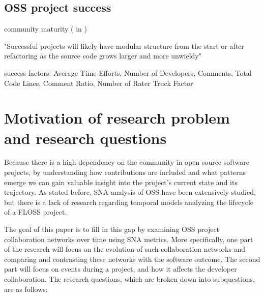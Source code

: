 \subsection{OSS project success}
community maturity (\cite{linBlogCommunityDiscovery2007} in \cite{aljemabiEmpiricalStudyEvolution2018})

"Successful projects will likely have modular structure from the start or after refactoring as the source code grows larger and more unwieldy" \cite{antwerpEvolutionOpenSource2010}

success factors: Average Time Efforts, Number of Developers, Comments, Total Code Lines, Comment Ratio, Number of Rater \cite{yangHowMicrobloggingNetworks2013}
Truck Factor \cite{avelinoNovelApproachEstimating2016}


\section{Motivation of research problem and research questions}
Because there is a high dependency on the community in open source software projects, by understanding how contributions are included and what patterns emerge we can gain valuable insight into the project's current state and its trajectory. As stated before, SNA analysis of OSS have been extensively studied, but there is a lack of research regarding temporal models analyzing the lifecycle of a FLOSS project.

The goal of this paper is to fill in this gap by examining OSS project collaboration networks over time using SNA metrics. More specifically, one part of the research will focus on the evolution of such collaboration networks and comparing and contrasting these networks with the software outcome. The second part will focus on events during a project, and how it affects the developer collaboration. The research questions, which are broken down into subquestions, are as follows:

